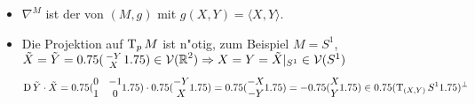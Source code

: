 \begin{bem}\begin{itemize}
\item
	$\nabla^M$ ist der  von $(M,g)$ mit $g(X,Y) = \langle X, Y \rangle$.
\item
	Die Projektion auf $\operatorname{T}_pM$ ist n"otig, zum Beispiel $M = S^1$, $\tilde X = \tilde Y = 0.75(\begin{smallmatrix} -Y \\ X \end{smallmatrix}1.75) \in \operatorname{\mathcal{V}}(\operatorname{\mathbb{R}}^2) \Rightarrow X = Y = \tilde X|_{S^1} \in \operatorname{\mathcal{V}}(S^1)$
		\[ \D \tilde Y \cdot \tilde X = \begin{pmatrix} 0 & -1 \\ 1 & 0 \end{pmatrix} \cdot \begin{pmatrix} -Y \\ X \end{pmatrix} = \begin{pmatrix} -X \\ -Y \end{pmatrix} = -\begin{pmatrix} X \\ Y \end{pmatrix} \in \left( \T_{(X,Y)}S^1 \right)^\perp \]
\end{itemize}\end{bem}

